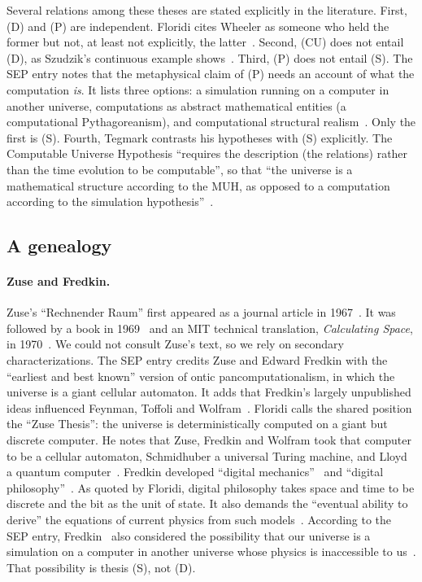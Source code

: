 Several relations among these theses are stated explicitly in the literature.
First, (D) and (P) are independent. Floridi cites Wheeler as someone who held
the former but not, at least not explicitly, the latter~\cite{Floridi2009against}.
Second, (CU) does not entail (D), as Szudzik's continuous example
shows~\cite{Szudzik2012computable}. Third, (P) does not entail (S). The SEP
entry notes that the metaphysical claim of (P) needs an account of what the
computation \emph{is}. It lists three options: a simulation running on a
computer in another universe, computations as abstract mathematical entities
(a computational Pythagoreanism), and computational structural
realism~\cite{Piccinini2025computation}. Only the first is (S). Fourth,
Tegmark contrasts his hypotheses with (S) explicitly. The Computable Universe
Hypothesis ``requires the description (the relations) rather than the time
evolution to be computable'', so that ``the universe is a mathematical
structure according to the MUH, as opposed to a computation according to the
simulation hypothesis''~\cite{Tegmark2008mathematical}.

\subsection{A genealogy}
\label{sec:digital-physics:genealogy}

\paragraph{Zuse and Fredkin.} Zuse's ``Rechnender Raum'' first appeared as a
journal article in 1967~\cite{Zuse1967rechnender}. It was followed by a book in
1969~\cite{Zuse1969rechnender} and an MIT technical translation, \emph{Calculating
Space}, in 1970~\cite{Zuse1970calculating}. We could not consult Zuse's text,
so we rely on secondary characterizations. The SEP entry credits Zuse and
Edward Fredkin with the ``earliest and best known'' version of ontic
pancomputationalism, in which the universe is a giant cellular automaton. It
adds that Fredkin's largely unpublished ideas influenced Feynman, Toffoli and
Wolfram~\cite{Piccinini2025computation}. Floridi calls the shared position the
``Zuse Thesis'': the universe is deterministically computed on a giant but
discrete computer. He notes that Zuse, Fredkin and Wolfram took that computer
to be a cellular automaton, Schmidhuber a universal Turing machine, and Lloyd a
quantum computer~\cite{Floridi2009against}. Fredkin developed ``digital
mechanics''~\cite{Fredkin1990informational} and ``digital
philosophy''~\cite{Fredkin2003introduction}. As quoted by Floridi, digital
philosophy takes space and time to be discrete and the bit as the unit of
state. It also demands the ``eventual ability to derive'' the equations of
current physics from such models~\cite{Floridi2009against}. According to the
SEP entry, Fredkin~\cite{Fredkin2003introduction} also considered the
possibility that our universe is a simulation on a computer in another universe
whose physics is inaccessible to us~\cite{Piccinini2025computation}. That
possibility is thesis (S), not (D).

